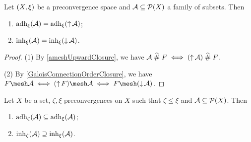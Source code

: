 \begin{lemma} \label{adherenceInherenceOrderClosure}
Let $\sSet{X,\xi}$ be a preconvergence space and $\mathcal{A}\subseteq \operatorname{\mathcal{P}}(X)$ a family of subsets. Then
\begin{enumerate}
\item $\operatorname{adh}_\xi(\mathcal{A}) = \operatorname{adh}_\xi(\operatorname{\uparrow}\mathcal{A})$;
\item $\operatorname{inh}_\xi(\mathcal{A}) = \operatorname{inh}_\xi(\operatorname{\downarrow}\mathcal{A})$.
\end{enumerate}
\end{lemma}
\begin{proof}
(1) By \ref{ameshUpwardClosure}, we have $\mathcal{A}\mathrel{\widehat{\#}} F \iff (\operatorname{\uparrow}\mathcal{A})\mathrel{\widehat{\#}} F$.

(2) By \ref{GaloisConnectionOrderClosure}, we have $F\mesh\mathcal{A} \iff (\upset F)\mesh\mathcal{A} \iff F\mesh(\downset \mathcal{A})$.
\end{proof}

\begin{lemma} \label{inherenceAdherenceMonotoneInConvergence}
Let $X$ be a set, $\zeta, \xi$ preconvergences on $X$ such that $\zeta \leq \xi$ and $\mathcal{A}\subseteq \operatorname{\mathcal{P}}(X)$. Then
\begin{enumerate}
\item $\operatorname{adh}_\zeta(\mathcal{A}) \subseteq \operatorname{adh}_\xi(\mathcal{A})$;
\item $\operatorname{inh}_\zeta(\mathcal{A}) \supseteq \operatorname{inh}_\xi(\mathcal{A})$.
\end{enumerate}
\end{lemma}

